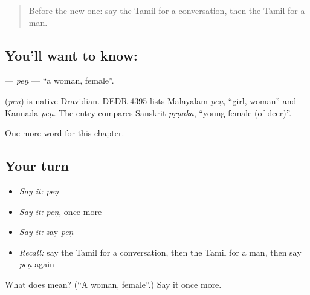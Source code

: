 \label{lesson:TA-C245-pen}



\begin{quote}
Before the new one: say the Tamil for a conversation, then the Tamil for a man.
\end{quote}

\subsection*{You'll want to know: }
\textbf{} — \emph{peṇ} — \textquotedblleft{}a woman, female\textquotedblright{}.

\begin{cousinweb}
\textbf{} (\emph{peṇ}) is native Dravidian. DEDR 4395 lists Malayalam \emph{peṇ}, \textquotedblleft{}girl, woman\textquotedblright{} and Kannada \emph{peṇ}. The entry compares Sanskrit \emph{pṛṇākā}, \textquotedblleft{}young female (of deer)\textquotedblright{}.
\end{cousinweb}

\begin{grammarlens}[title={What you've built}]
One more word for this chapter.
\end{grammarlens}

\subsection*{Your turn}
\begin{itemize}
\raggedright
  \item \emph{Say it:} \emph{peṇ}
  \item \emph{Say it:} \emph{peṇ}, once more
  \item \emph{Say it:} say \emph{peṇ}
  \item \emph{Recall:} say the Tamil for a conversation, then the Tamil for a man, then say \emph{peṇ} again
\end{itemize}

\begin{tcolorbox}[breakable,colback=teal!4,colframe=teal!35!black,title={Before you move on}]
What does  mean? (\textquotedblleft{}A woman, female\textquotedblright{}.) Say it once more.
\end{tcolorbox}
